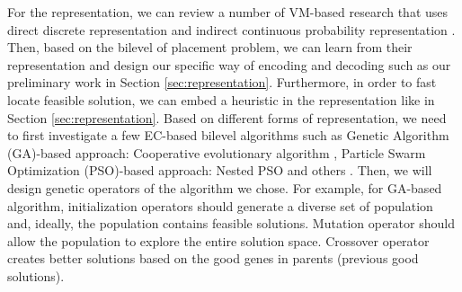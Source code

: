 \begin{enumerate}
	 For the representation, we can review a number of VM-based research that uses direct discrete representation \cite{Xu:2010vh} and indirect continuous probability representation \cite{Xiong:2014jq}. Then, based on the bilevel of placement problem, we can learn from their representation and design our specific way of encoding and decoding such as our preliminary work in Section \ref{sec:representation}. Furthermore, in order to fast locate feasible solution, we can embed a heuristic in the representation like in Section \ref{sec:representation}. 
	Based on different forms of representation, we need to first investigate a few EC-based bilevel algorithms such as Genetic Algorithm (GA)-based approach: Cooperative evolutionary algorithm \cite{Legillon:2012dd}, Particle Swarm Optimization (PSO)-based approach: Nested PSO \cite{Li:2006br} and others \cite{Angelo:2013ee, Zhu:2006in}. Then, we will design genetic operators of the algorithm we chose. For example, for GA-based algorithm, initialization operators should generate a diverse set of population and, ideally, the population contains feasible solutions. Mutation operator should allow the population to explore the entire solution space. Crossover operator creates better solutions based on the good genes in parents (previous good solutions).
	




\end{enumerate}
